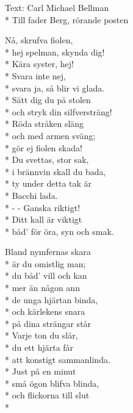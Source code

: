 \begin{SongText}
    \begin{SongInfo}
        Text: Carl Michael Bellman\\*%
        Till fader Berg, rörande posten
    \end{SongInfo}
    \begin{SongVerse}
        Nå, skrufva fiolen,\\*%
        hej spelman, skynda dig!\\*%
        Kära syster, hej!\\*%
        Svara inte nej,\\*%
        svara ja, så blir vi glada.\\*%
        Sätt dig du på stolen\\*%
        och stryk din silfversträng!\\*%
        Röda stråken släng\\*%
        och med armen sväng;\\*%
        gör ej fiolen skada!\\*%
        Du svettas, stor sak,\\*%
        i brännvin skall du bada,\\*%
        ty under detta tak är\\*%
        Bacchi lada.\\*%
        - - Ganska riktigt!\\*%
        Ditt kall är viktigt\\*%
        båd’ för öra, syn och smak.
    \end{SongVerse}
    \begin{SongVerse}
        Bland nymfernas skara\\*%
        är du omistlig man;\\*%
        du båd’ vill och kan\\*%
        mer än någon ann\\*%
        de unga hjärtan binda,\\*%
        och kärlekens snara\\*%
        på dina strängar står\\*%
        Varje ton du slår,\\*%
        du ett hjärta får\\*%
        att konstigt sammanlinda.\\*%
        Just på en minut\\*%
        små ögon blifva blinda,\\*%
        och flickorna till slut\\*%

\end{SongVerse}
\end{SongText}

